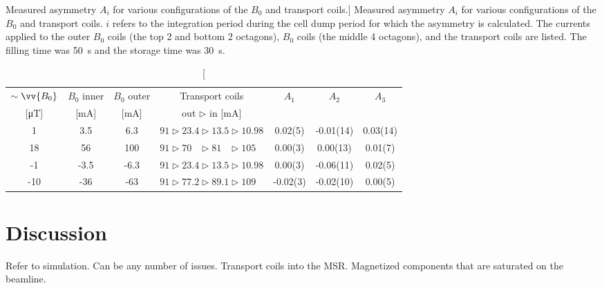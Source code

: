 \begin{table}
\centering
\caption
[Measured asymmetry $A_i$ for various configurations of the $B_0$ and transport coils.]
{Measured asymmetry $A_i$ for various configurations of the $B_0$ and transport coils. $i$ refers to the integration period during the cell dump period for which the asymmetry is calculated. The currents applied to the outer $B_0$ coils (the top 2 and bottom 2 octagons), $B_0$ coils (the middle 4 octagons), and the transport coils are listed. The filling time was \qty{50}{s} and the storage time was \qty{30}{s}.}\label{tb:t1_2022_measurements}
\begin{tabular}{
    S[table-format = 2.0]
    S
    S
    c
    S[table-format = 1.2(2)]
    S[table-format = 1.2(2)]
    S[table-format = 1.2(2)]
}
\toprule
{$\sim\vv{B_0}$} 	& {$B_0$ inner}	& {$B_0$ outer} & {Transport coils} & {$A_1$} & {$A_2$} & {$A_3$}\\
{[\unit{\micro\tesla}]} 	& {[mA]}	& {[mA]} & {out $\triangleright$ in [mA]} & {} & {} & {}\\
 & 3.5 & 6.3 & {$91\triangleright 23.4 \triangleright 13.5 \triangleright 10.98$} & 0.02(5) & -0.01(14) & 0.03(14) \\
18 & 56 & 100 & {$91\triangleright 70\phantom{.0} \triangleright 81\phantom{.0} \triangleright 105\phantom{.0}$} & 0.00(3) & 0.00(13) & 0.01(7) \\
-1 & -3.5 & -6.3 & {$91\triangleright 23.4 \triangleright 13.5 \triangleright 10.98$} & 0.00(3) & -0.06(11) & 0.02(5) \\
-10 & -36 & -63 & {$91\triangleright 77.2 \triangleright 89.1 \triangleright 109\phantom{.0}$} & -0.02(3) & -0.02(10) & 0.00(5) \\
\bottomrule
\end{tabular}
\end{table}



\section{Discussion}


Refer to simulation. Can be any number of issues. Transport coils into the MSR. Magnetized components that are saturated on the beamline.